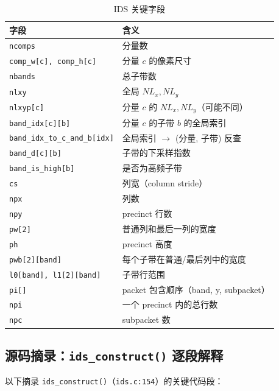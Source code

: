 \begin{table}[H]
\centering
\caption{IDS 关键字段}
\begin{tabular}{@{}ll@{}}
\toprule
字段 & 含义 \\
\midrule
\texttt{ncomps} & 分量数 \\
\texttt{comp\_w[c], comp\_h[c]} & 分量 $c$ 的像素尺寸 \\
\texttt{nbands} & 总子带数 \\
\texttt{nlxy} & 全局 $NL_x, NL_y$ \\
\texttt{nlxyp[c]} & 分量 $c$ 的 $NL_x, NL_y$（可能不同） \\
\texttt{band\_idx[c][b]} & 分量 $c$ 的子带 $b$ 的全局索引 \\
\texttt{band\_idx\_to\_c\_and\_b[idx]} & 全局索引 $\to$ (分量, 子带) 反查 \\
\texttt{band\_d[c][b]} & 子带的下采样指数 \\
\texttt{band\_is\_high[b]} & 是否为高频子带 \\
\texttt{cs} & 列宽（column stride） \\
\texttt{npx} & 列数 \\
\texttt{npy} & precinct 行数 \\
\texttt{pw[2]} & 普通列和最后一列的宽度 \\
\texttt{ph} & precinct 高度 \\
\texttt{pwb[2][band]} & 每个子带在普通/最后列中的宽度 \\
\texttt{l0[band], l1[2][band]} & 子带行范围 \\
\texttt{pi[]} & packet 包含顺序（band, y, subpacket） \\
\texttt{npi} & 一个 precinct 内的总行数 \\
\texttt{npc} & subpacket 数 \\
\bottomrule
\end{tabular}
\end{table}

\subsection{源码摘录：\texttt{ids\_construct()} 逐段解释}

以下摘录 \texttt{ids\_construct()}（\texttt{ids.c:154}）的关键代码段：

